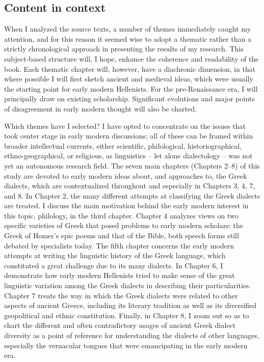 \documentclass[output=paper]{langsci/langscibook}
\begin{document}
\subsection{Content in context}
\hypertarget{Toc19704805}{}
When I analyzed the source texts, a number of themes immediately caught my attention, and for this reason it seemed wise to adopt a thematic rather than a strictly chronological approach in presenting the results of my research. This subject-based structure will, I hope, enhance the coherence and readability of the book. Each thematic chapter will, however, have a diachronic dimension, in that where possible I will first sketch ancient and medieval ideas, which were usually the starting point for early modern Hellenists. For the pre-Renaissance era, I will principally draw on existing scholarship. Significant evolutions and major points of disagreement in early modern thought will also be charted.

Which themes have I selected? I have opted to concentrate on the issues that took center stage in early modern discussions; all of these can be framed within broader intellectual currents, either scientific, philological, historiographical, ethno-geographical, or religious, as linguistics – let alone dialectology – was not yet an autonomous research field. The seven main chapters (Chapters 2–8) of this study are devoted to early modern ideas about, and approaches to, the Greek dialects, which are contextualized throughout and especially in Chapters 3, 4, 7, and 8. In Chapter 2, the many different attempts at classifying the Greek dialects are treated. I discuss the main motivation behind the early modern interest in this topic, philology, in the third chapter. Chapter 4 analyzes views on two specific varieties of Greek that posed problems to early modern scholars: the Greek of Homer’s epic poems and that of the Bible, both speech forms still debated by specialists today. The fifth chapter concerns the early modern attempts at writing the linguistic history of the Greek language, which constituted a great challenge due to its many dialects. In Chapter 6, I demonstrate how early modern Hellenists tried to make sense of the great linguistic variation among the Greek dialects in describing their particularities. Chapter 7 treats the way in which the Greek dialects were related to other aspects of ancient Greece, including its literary tradition as well as its diversified geopolitical and ethnic constitution. Finally, in Chapter 8, I zoom out so as to chart the different and often contradictory usages of ancient Greek dialect diversity as a point of reference for understanding the dialects of other languages, especially the vernacular tongues that were emancipating in the early modern era.
\end{document}
